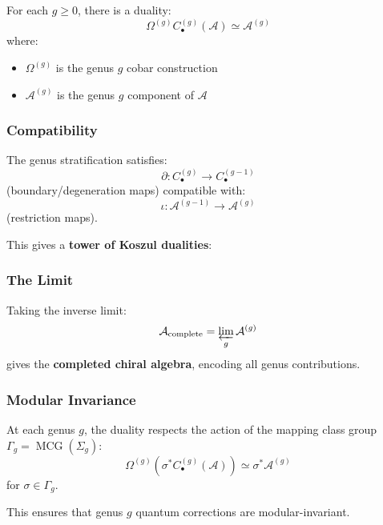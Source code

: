 For each $g \geq 0$, there is a duality:
$$\Omega^{(g)} C_{\bullet}^{(g)}(\mathcal{A}) \simeq \mathcal{A}^{(g)}$$
where:
\begin{itemize}
\item $\Omega^{(g)}$ is the genus $g$ cobar construction
\item $\mathcal{A}^{(g)}$ is the genus $g$ component of $\mathcal{A}$
\end{itemize}

\subsubsection{Compatibility}

The genus stratification satisfies:
$$\partial: C_{\bullet}^{(g)} \to C_{\bullet}^{(g-1)}$$
(boundary/degeneration maps) compatible with:
$$\iota: \mathcal{A}^{(g-1)} \to \mathcal{A}^{(g)}$$
(restriction maps).

This gives a \textbf{tower of Koszul dualities}:
\begin{center}
\end{center}

\subsubsection{The Limit}

Taking the inverse limit:
$$\mathcal{A}_{\text{complete}} = \varprojlim_g \mathcal{A}^{(g)}$$
gives the \textbf{completed chiral algebra}, encoding all genus contributions.

\subsubsection{Modular Invariance}

At each genus $g$, the duality respects the action of the mapping class group $\Gamma_g = \operatorname{MCG}(\Sigma_g)$:
$$\Omega^{(g)}(\sigma^* C_{\bullet}^{(g)}(\mathcal{A})) \simeq \sigma^* \mathcal{A}^{(g)}$$
for $\sigma \in \Gamma_g$.

This ensures that genus $g$ quantum corrections are modular-invariant.
